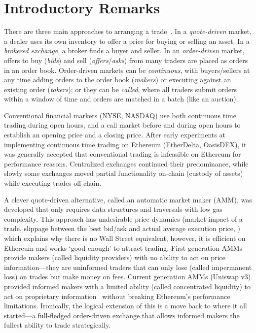 



\section{Introductory Remarks}

There are three main approaches to arranging a trade~\cite{Har03}. In a \emph{quote-driven} market, a dealer uses its own inventory to offer a price for buying or selling an asset. In a \emph{brokered exchange}, a broker finds a buyer and seller. In an \emph{order-driven} market, offers to buy (\emph{bids}) and sell (\emph{offers}/\emph{asks}) from many traders are placed as orders in an order book. Order-driven markets can be \emph{continuous}, with buyers/sellers at any time adding orders to the order book (\emph{makers}) or executing against an existing order (\emph{takers}); or they can be \emph{called}, where all traders submit orders within a window of time and orders are matched in a batch (like an auction). 

Conventional financial markets (\eg NYSE, NASDAQ) use both continuous time trading during open hours, and a call market before and during open hours to establish an opening price and a closing price. After early experiments at implementing continuous time trading on Ethereum (\eg EtherDelta, OasisDEX), it was generally accepted that conventional trading is infeasible on Ethereum for performance reasons. Centralized exchanges continued their predominance, while slowly some exchanges moved partial functionality on-chain (\eg custody of assets) while executing trades off-chain. 

A clever quote-driven alternative, called an automatic market maker (AMM), was developed that only requires data structures and traversals with low gas complexity. This approach has undesirable price dynamics (\eg market impact of a trade, slippage between the best bid/ask and actual average execution price, \etc) which explains why there is no Wall Street equivalent, however, it is efficient on Ethereum and works `good enough' to attract trading. First generation AMMs provide makers (called liquidity providers) with no ability to act on price information---they are uninformed traders that can only lose (called impermanent loss) on trades but make money on fees. Current generation AMMs (\eg Uniswap v3) provided informed makers with a limited ability (called concentrated liquidity) to act on proprietary information~\cite{Park21} without breaking Ethereum's performance limitations. Ironically, the logical extension of this is a move back to where it all started---a full-fledged order-driven exchange that allows informed makers the fullest ability to trade strategically.



